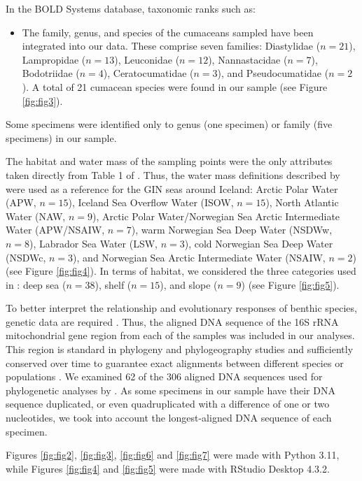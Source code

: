 In the BOLD Systems database, taxonomic ranks such as: 
\begin{itemize}
\item The family, genus, and species of the cumaceans sampled have been integrated into our data. These comprise seven families: Diastylidae ($n=21$), Lampropidae ($n=13$), Leuconidae ($n=12$), Nannastacidae ($n=7$), Bodotriidae ($n=4$), Ceratocumatidae ($n=3$), and Pseudocumatidae ($n=2$). A total of 21 cumacean species were found in our sample (see Figure \ref{fig:fig3}).
\end{itemize}

Some specimens were identified only to genus (one specimen) or family (five specimens) in our sample.
 
The habitat and water mass of the sampling points were the only attributes taken directly from Table 1 of \citep{uhlir_adding_2021}. Thus, the water mass definitions described by \citep{hansen_north_2000, brix2010distribution, ostmann_marine_2014} were used as a reference for the GIN seas around Iceland: Arctic Polar Water (APW, $n=15$), Iceland Sea Overflow Water (ISOW, $n=15$), North Atlantic Water (NAW, $n=9$), Arctic Polar Water/Norwegian Sea Arctic Intermediate Water (APW/NSAIW, $n=7$), warm Norwegian Sea Deep Water (NSDWw, $n=8$), Labrador Sea Water (LSW, $n=3$), cold Norwegian Sea Deep Water (NSDWc, $n=3$), and Norwegian Sea Arctic Intermediate Water (NSAIW, $n=2$) (see Figure \ref{fig:fig4}). In terms of habitat, we considered the three categories used in \citep{uhlir_adding_2021}: deep sea ($n=38$), shelf ($n=15$), and slope ($n=9$) (see Figure \ref{fig:fig5}).

To better interpret the relationship and evolutionary responses of benthic species, genetic data are required \citep{wilson_speciation_1987, uhlir_adding_2021}. Thus, the aligned DNA sequence of the 16S rRNA mitochondrial gene region from each of the samples was included in our analyses. This region is standard in phylogeny and phylogeography studies \citep{hugenholtz1998impact} and sufficiently conserved over time to guarantee exact alignments between different species or populations \citep{saccone1999evolutionary}. We examined 62 of the 306 aligned DNA sequences used for phylogenetic analyses by \citep{uhlir_adding_2021}. As some specimens in our sample have their DNA sequence duplicated, or even quadruplicated with a difference of one or two nucleotides, we took into account the longest-aligned DNA sequence of each specimen. 

Figures \ref{fig:fig2}, \ref{fig:fig3}, \ref{fig:fig6} and \ref{fig:fig7} were made with Python 3.11, while Figures \ref{fig:fig4} and \ref{fig:fig5} were made with RStudio Desktop 4.3.2.

